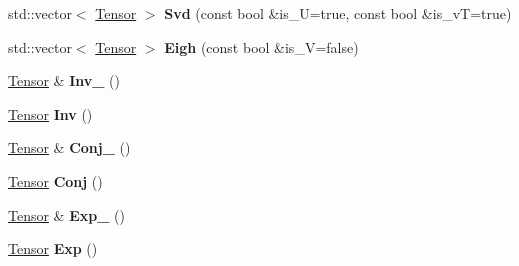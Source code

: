 \begin{DoxyCompactItemize}
\item 
\mbox{\label{classcytnx_1_1Tensor_a0dc4a19c04d3576c3364deb74251d855}} 
std\+::vector$<$ \hyperlink{classcytnx_1_1Tensor}{Tensor} $>$ {\bfseries Svd} (const bool \&is\+\_\+U=true, const bool \&is\+\_\+vT=true)
\item 
\mbox{\label{classcytnx_1_1Tensor_ac456006e0fbd6108dddc520e4ad12ff7}} 
std\+::vector$<$ \hyperlink{classcytnx_1_1Tensor}{Tensor} $>$ {\bfseries Eigh} (const bool \&is\+\_\+V=false)
\item 
\mbox{\label{classcytnx_1_1Tensor_ad21dcb7ba06d23c78ee5fd4e9266a462}} 
\hyperlink{classcytnx_1_1Tensor}{Tensor} \& {\bfseries Inv\+\_\+} ()
\item 
\mbox{\label{classcytnx_1_1Tensor_a7ed6193e29219ff1a2ca2ca95b8b5969}} 
\hyperlink{classcytnx_1_1Tensor}{Tensor} {\bfseries Inv} ()
\item 
\mbox{\label{classcytnx_1_1Tensor_a9312d8faf3fdc8ffe5a7687f88986a1e}} 
\hyperlink{classcytnx_1_1Tensor}{Tensor} \& {\bfseries Conj\+\_\+} ()
\item 
\mbox{\label{classcytnx_1_1Tensor_acf65f5c4d143eb165f7161e58a06b7e4}} 
\hyperlink{classcytnx_1_1Tensor}{Tensor} {\bfseries Conj} ()
\item 
\mbox{\label{classcytnx_1_1Tensor_a4ebfd2713960db958ddb23c4e06c17c4}} 
\hyperlink{classcytnx_1_1Tensor}{Tensor} \& {\bfseries Exp\+\_\+} ()
\item 
\mbox{\label{classcytnx_1_1Tensor_aca1b7e9ae53b3529a7f79b24991c9373}} 
\hyperlink{classcytnx_1_1Tensor}{Tensor} {\bfseries Exp} ()
\end{DoxyCompactItemize}
\textbf{ }\par
